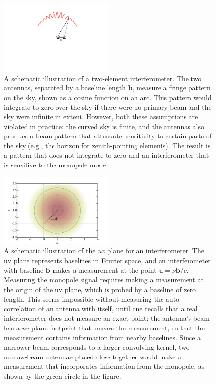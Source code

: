 \documentclass[twocolumn,apj,numberedappendix]{emulateapj}
\def\b{\mathbf{b}}
\begin{document}
\begin{figure}[h]
	\centering
	\includegraphics[width=0.50\textwidth]{figures/beam_pattern_cartoon.pdf}
	\caption{A schematic illustration of a two-element interferometer. The two antennas, separated by a baseline length $\b$, measure a fringe pattern on the sky, shown as a cosine function on an arc. This pattern would integrate to zero over the sky if there were no primary beam and the sky were infinite in extent. However, both these assumptions are violated in practice: the curved sky is finite, and the antennas also produce a beam pattern that attenuate sensitivity to certain parts of the sky (e.g., the horizon for zenith-pointing elements). The result is a pattern that does not integrate to zero and an interferometer that is sensitive to the monopole mode.}
	\label{fig:beam_pattern_cartoon}
\end{figure}

\begin{figure}[h]
	\centering
	\includegraphics[width=0.50\textwidth]{figures/uv_cartoon.pdf}
	\caption{A schematic illustration of the $uv$ plane for an interferometer. The uv plane represents baselines in Fourier space, and an interferometer with baseline $\b$ makes a measurement at the point $\mathbf{u} = \nu\b / c$. Measuring the monopole signal requires making a measurement at the origin of the uv plane, which is probed by a baseline of zero length. This seems impossible without measuring the auto-correlation of an antenna with itself, until one recalls that a real interferometer does not measure an exact point: the antenna's beam has a $uv$ plane footprint that smears the measurement, so that the measurement contains information from nearby baselines. Since a narrower beam corresponds to a larger convolving kernel, two narrow-beam antennae placed close together would make a measurement that incorporates information from the monopole, as shown by the green circle in the figure.}
	\label{fig:uv_cartoon}
\end{figure}
\end{document}
